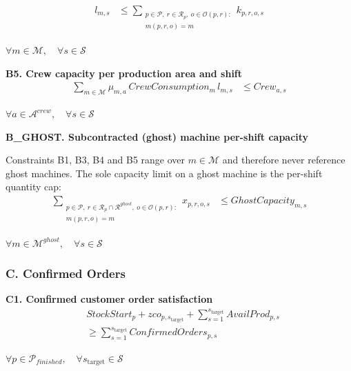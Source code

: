 \documentclass{article}
\begin{document}
\begin{align}
l_{m,s}
&\le
\sum_{\substack{p \in \mathcal{P},\ r \in \mathcal{R}_p,\ o \in \mathcal{O}(p,r):\\ m(p,r,o)=m}}
k_{p,r,o,s}
\label{eq:B4_only_open_processed}
\end{align}
\begin{center}
$\forall m \in \mathcal{M}, \quad
\forall s \in \mathcal{S}$
\end{center}


\noindent\textbf{B5. Crew capacity per production area and shift}
\begin{align}
\sum_{m \in \mathcal{M}}
\mu_{m,a}\,
CrewConsumption_m\,
l_{m,s}
&\le
Crew_{a,s}
\label{eq:B5_crew_capacity}
\end{align}
\begin{center}
$\forall a \in \mathcal{A}^{crew}, \quad
\forall s \in \mathcal{S}$
\end{center}

\noindent\textbf{B\_GHOST. Subcontracted (ghost) machine per-shift capacity}

Constraints B1, B3, B4 and B5 range over $m \in \mathcal{M}$ and therefore never reference ghost machines. The sole capacity limit on a ghost machine is the per-shift quantity cap:
\begin{align}
\sum_{\substack{p \in \mathcal{P},\ r \in \mathcal{R}_p \cap \mathcal{R}^{ghost},\ o \in \mathcal{O}(p,r):\\ m(p,r,o)=m}}
x_{p,r,o,s}
&\le
GhostCapacity_{m,s}
\label{eq:Bghost_capacity}
\end{align}
\begin{center}
$\forall m \in \mathcal{M}^{ghost}, \quad
\forall s \in \mathcal{S}$
\end{center}

\noindent\text{---------------------------------------------------------------------------------------------------------}

\subsubsection*{C. Confirmed Orders}

\noindent\textbf{C1. Confirmed customer order satisfaction}
\begin{align}
&
StockStart_p
+
zco_{p,s_{\text{target}}}
+
\sum_{s=1}^{s_{\text{target}}}
AvailProd_{p,s}
\nonumber \\
&\ge
\sum_{s=1}^{s_{\text{target}}}
ConfirmedOrders_{p,s}
\label{eq:C1_confirmed_orders}
\end{align}
\begin{center}
$\forall p \in \mathcal{P}_{finished}, \quad
\forall s_{\text{target}} \in \mathcal{S}$
\end{center}
\end{document}
